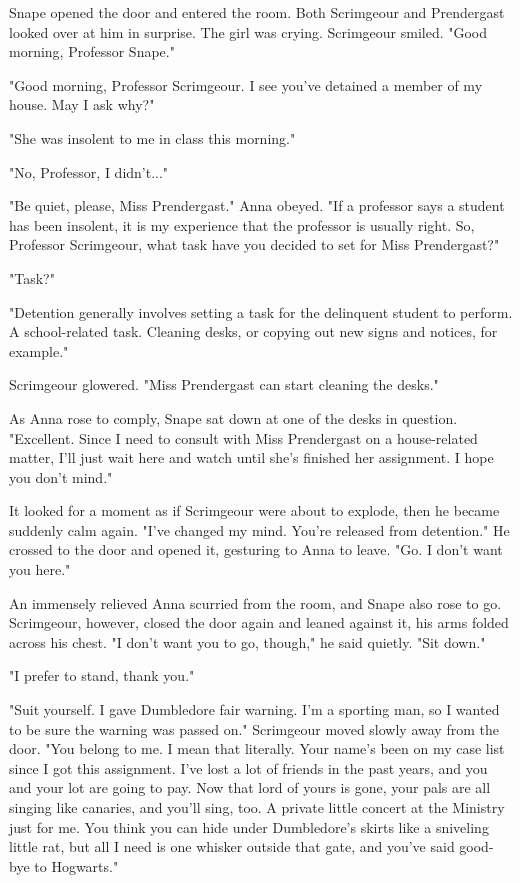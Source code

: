 Snape opened the door and entered the room. Both Scrimgeour and Prendergast looked over at him in surprise. The girl was crying. Scrimgeour smiled. "Good morning, Professor Snape."

"Good morning, Professor Scrimgeour. I see you've detained a member of my house. May I ask why?"

"She was insolent to me in class this morning."

"No, Professor, I didn't..."

"Be quiet, please, Miss Prendergast." Anna obeyed. "If a professor says a student has been insolent, it is my experience that the professor is usually right. So, Professor Scrimgeour, what task have you decided to set for Miss Prendergast?"

"Task?"

"Detention generally involves setting a task for the delinquent student to perform. A school-related task. Cleaning desks, or copying out new signs and notices, for example."

Scrimgeour glowered. "Miss Prendergast can start cleaning the desks."

As Anna rose to comply, Snape sat down at one of the desks in question. "Excellent. Since I need to consult with Miss Prendergast on a house-related matter, I'll just wait here and watch until she's finished her assignment. I hope you don't mind."

It looked for a moment as if Scrimgeour were about to explode, then he became suddenly calm again. "I've changed my mind. You're released from detention." He crossed to the door and opened it, gesturing to Anna to leave. "Go. I don't want you here."

An immensely relieved Anna scurried from the room, and Snape also rose to go. Scrimgeour, however, closed the door again and leaned against it, his arms folded across his chest. "I don't want you to go, though," he said quietly. "Sit down."

"I prefer to stand, thank you."

"Suit yourself. I gave Dumbledore fair warning. I'm a sporting man, so I wanted to be sure the warning was passed on." Scrimgeour moved slowly away from the door. "You belong to me. I mean that literally. Your name's been on my case list since I got this assignment. I've lost a lot of friends in the past years, and you and your lot are going to pay. Now that lord of yours is gone, your pals are all singing like canaries, and you'll sing, too. A private little concert at the Ministry just for me. You think you can hide under Dumbledore's skirts like a sniveling little rat, but all I need is one whisker outside that gate, and you've said good-bye to Hogwarts."

